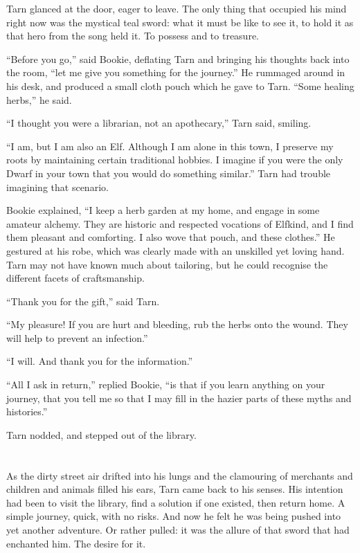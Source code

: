 Tarn glanced at the door, eager to leave.  The only thing that occupied his mind right now was the mystical teal sword: what it must be like to see it, to hold it as that hero from the song held it.  To possess and to treasure.

``Before you go,'' said Bookie, deflating Tarn and bringing his thoughts back into the room, ``let me give you something for the journey.''  He rummaged around in his desk, and produced a small cloth pouch which he gave to Tarn.  ``Some healing herbs,'' he said.

``I thought you were a librarian, not an apothecary,'' Tarn said, smiling.

``I am, but I am also an Elf.  Although I am alone in this town, I preserve my roots by maintaining certain traditional hobbies.  I imagine if you were the only Dwarf in your town that you would do something similar.''  Tarn had trouble imagining that scenario.

Bookie explained, ``I keep a herb garden at my home, and engage in some amateur alchemy.  They are historic and respected vocations of Elfkind, and I find them pleasant and comforting.  I also wove that pouch, and these clothes.''  He gestured at his robe, which was clearly made with an unskilled yet loving hand.  Tarn may not have known much about tailoring, but he could recognise the different facets of craftsmanship.

``Thank you for the gift,'' said Tarn.

``My pleasure!  If you are hurt and bleeding, rub the herbs onto the wound.  They will help to prevent an infection.''

``I will.  And thank you for the information.''

``All I ask in return,'' replied Bookie, ``is that if you learn anything on your journey, that you tell me so that I may fill in the hazier parts of these myths and histories.''

Tarn nodded, and stepped out of the library.


\chapter{}
As the dirty street air drifted into his lungs and the clamouring of merchants and children and animals filled his ears, Tarn came back to his senses.  His intention had been to visit the library, find a solution if one existed, then return home.  A simple journey, quick, with no risks.  And now he felt he was being pushed into yet another adventure.  Or rather pulled: it was the allure of that sword that had enchanted him.  The desire for it.

